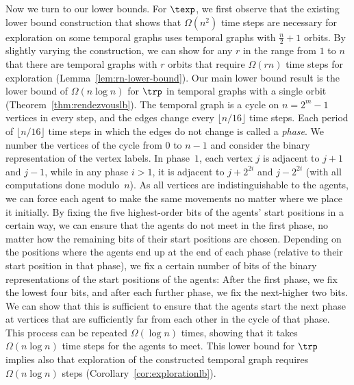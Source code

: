 Now we turn to our lower bounds.
For $\texp$, we first observe that the
existing lower bound construction that shows that $\Omega(n^2)$ time steps are
necessary for exploration on some temporal graphs uses temporal graphs with
$\frac{n}{2}+1$ orbits. By slightly varying the construction, we can show
for any $r$ in the range from $1$ to $n$
that there are temporal graphs with $r$ orbits that require
$\Omega(rn)$ time steps for exploration (Lemma~\ref{lem:rn-lower-bound}).
Our main lower bound result is the lower bound of
$\Omega(n\log n)$ for $\trp$ in temporal graphs with a single orbit
(Theorem~\ref{thm:rendezvouslb}). The
temporal graph is a cycle {on $n=2^m-1$ vertices} in every step, and the
edges change every $\lfloor n/16\rfloor$ time steps. Each period of $\lfloor
n/16\rfloor$ time steps in which the edges do not change is called a
\emph{phase}. We number the vertices of the cycle from $0$ to $n-1$ and consider
the binary representation of the vertex labels. {In phase~$1$, each vertex
$j$ is adjacent to $j+1$ and $j-1$, while in any phase $i>1$, it is adjacent to
$j+2^{2i}$ and $j-2^{2i}$ (with all computations done modulo~$n$).} As all
vertices are indistinguishable to the agents, we can force each agent to make
the same movements no matter where we place it initially. By fixing the five
highest-order bits of the agents' start positions in a certain way, we can
ensure that the agents do not meet in the first phase, no matter how the
remaining bits of their start positions are chosen. Depending on the positions
where the agents end up at the end of each phase (relative to their start
position in that phase), {we fix a certain number of bits of the binary
representations of the start positions of the agents: After the first phase, we
fix the lowest four bits, and after each further phase, we fix the next-higher
two bits. We can show that this is sufficient to ensure} that the agents start
the next phase at vertices that are sufficiently far from each other in the
cycle of that phase. This process can be repeated $\Omega(\log n)$ times,
showing that it takes $\Omega(n \log n)$ {time steps} for the agents to meet. This lower
bound for $\trp$ implies also that exploration of the constructed temporal graph
requires $\Omega(n \log n)$ steps (Corollary~\ref{cor:explorationlb}).


